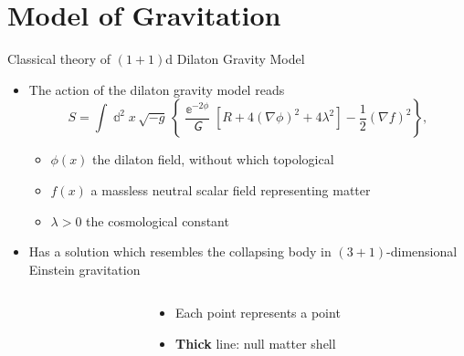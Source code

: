 \documentclass{beamer}
\newcommand{\ee}{{\Bbbe}}
\newcommand{\rbr}[1]{{\left(#1\right)}}
\newcommand{\sbr}[1]{{\left[#1\right]}}
\newcommand{\cbr}[1]{{\left\{#1\right\}}}
\newcommand{\rfun}[2]{{#1}\mathopen{}\left(#2\right)\mathclose{}}
\newcommand{\dd}{\Bbbd}
\newcommand{\ol}[1]{{\overline{{#1}}}}
\newcommand{\nG}{\mitsansG} %
\begin{document}
\section{Model of Gravitation}

\begin{frame}[allowframebreaks]{Classical theory of $\rbr{1+1}$d 
Dilaton Gravity Model}{\cite{Callan1992,Demers1996,Ashtekar2011}}%

\begin{itemize}
\item The action of the dilaton gravity model reads
\begin{equation}
S = \int \dd^2 x\,\sqrt{-g}\,\cbr{\frac{\ee^{-2\phi}}{\nG}
\sbr{R+4\rbr{\nabla \phi}^2 + 4\lambda^2}
-\frac{1}{2}\rbr{\nabla f}^2},
\end{equation}
\begin{itemize}
\item $\rfun{\phi}{x}$ the dilaton field, without which topological
\item $\rfun{f}{x}$ a massless neutral scalar field representing matter
\item $\lambda > 0$ the cosmological constant
\end{itemize}

\item Has a solution which \alert{resembles} the collapsing body in 
$\rbr{3+1}$-dimensional Einstein gravitation
\end{itemize}

\begin{columns}
\begin{column}{.7\linewidth}
\begin{center}

\end{center}

\end{column}
\begin{column}{.3\linewidth}
\begin{itemize}
 \item Each point represents a \alert{point}
 \item \textbf{Thick} line: null matter \alert{shell}
\end{itemize}
\end{column}
 
\end{columns}


\end{frame}
\end{document}
